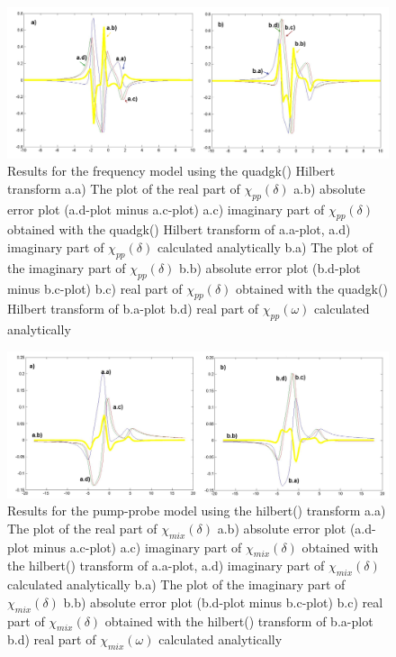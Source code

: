 \documentclass[12pt,twoside,a4paper]{article}
\numberwithin{equation}{subsection}
\numberwithin{figure}{subsection}
\begin{document}
\begin{figure} 
  \includegraphics[width=150mm]{img/quadgk_fmix.png}
  \caption{Results for the frequency model using the quadgk() Hilbert transform
     a.a) The plot of the real part of ${\chi_{pp}}(\delta )$
     a.b) absolute error plot (a.d-plot minus a.c-plot)
     a.c) imaginary part of ${\chi_{pp}}(\delta )$ obtained with the quadgk() Hilbert transform of a.a-plot, 
     a.d) imaginary part of ${\chi_{pp}}(\delta )$ calculated analytically 
     b.a) The plot of the imaginary part of ${\chi_{pp}}(\delta )$ 
     b.b) absolute error plot (b.d-plot minus b.c-plot)
     b.c) real part of ${\chi_{pp}}(\delta )$ obtained with the quadgk() Hilbert transform of b.a-plot 
     b.d) real part of $\chi_{pp} (\omega )$ calculated analytically 
     \label{fig:quadgk_fmix}
     }
\end{figure} 

\begin{figure} 
  \includegraphics[width=150mm]{img/hilb_pnp.png}
  \caption{Results for the pump-probe model using the hilbert() transform
     a.a) The plot of the real part of ${\chi_{mix}}(\delta )$
     a.b) absolute error plot (a.d-plot minus a.c-plot)
     a.c) imaginary part of ${\chi_{mix}}(\delta )$ obtained with the hilbert() transform of a.a-plot, 
     a.d) imaginary part of ${\chi_{mix}}(\delta )$ calculated analytically 
     b.a) The plot of the imaginary part of ${\chi_{mix}}(\delta )$ 
     b.b) absolute error plot (b.d-plot minus b.c-plot)
     b.c) real part of ${\chi_{mix}}(\delta )$ obtained with the hilbert() transform of b.a-plot  
     b.d) real part of $\chi_{mix} (\omega )$ calculated analytically 
     \label{fig:hilb_pnp}
     }
\end{figure}
\end{document}
